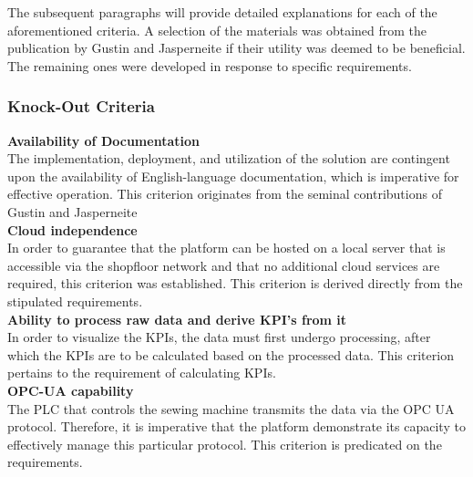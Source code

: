 The subsequent paragraphs will provide detailed explanations for each of the aforementioned criteria. A selection of the materials was obtained from the publication by Gustin and Jasperneite if their utility was deemed to be beneficial. The remaining ones were developed in response to specific requirements.

\subsubsection{Knock-Out Criteria}
\textbf{Availability of Documentation}\\
The implementation, deployment, and utilization of the solution are contingent upon the availability of English-language documentation, which is imperative for effective operation. This criterion originates from the seminal contributions of  Gustin and Jasperneite\\
\textbf{Cloud independence}\\
In order to guarantee that the platform can be hosted on a local server that is accessible via the shopfloor network and that no additional cloud services are required, this criterion was established. This criterion is derived directly from the stipulated requirements.\\
\textbf{Ability to process raw data and derive KPI's from it}\\
In order to visualize the KPIs, the data must first undergo processing, after which the KPIs are to be calculated based on the processed data. This criterion pertains to the requirement of calculating KPIs. \\
\textbf{OPC-UA capability}\\
The PLC that controls the sewing machine transmits the data via the OPC UA protocol. Therefore, it is imperative that the platform demonstrate its capacity to effectively manage this particular protocol. This criterion is predicated on the requirements.

